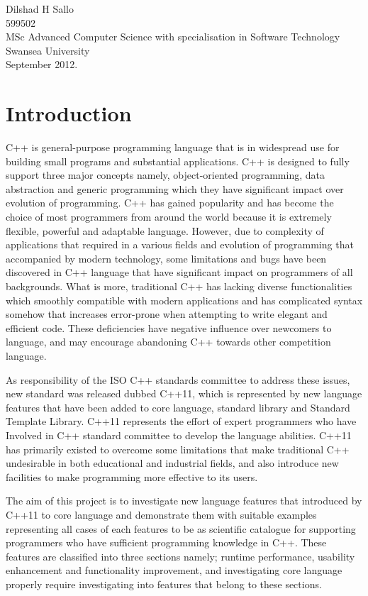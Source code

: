 \documentclass[11pt]{report}
\begin{document}
\begin{flushright}
Dilshad H Sallo\\
599502\\
MSc Advanced Computer Science with specialisation in Software Technology\\
Swansea University\\
September 2012.
\end{flushright}

\tableofcontents
\listoffigures

\chapter{Introduction}
\label{cha:intro}
C++ is general-purpose programming language that is in widespread use for building small programs and substantial applications. C++ is designed to fully support three major concepts namely, object-oriented programming, data abstraction and generic programming which they have significant impact over evolution of programming. C++ has gained popularity and has become the choice of most programmers from around the world because it is extremely flexible, powerful and adaptable language. However, due to complexity of applications that required in a various fields and evolution of programming that accompanied by modern technology, some limitations and bugs have been discovered in C++ language that have significant impact on programmers of all backgrounds.  What is more, traditional C++ has lacking diverse functionalities which smoothly compatible with modern applications and has complicated syntax somehow that increases error-prone when attempting to write elegant and efficient code.  These deficiencies have negative influence over newcomers to language, and may encourage abandoning C++ towards other competition language. 

As responsibility of the ISO C++ standards committee to address these issues, new standard was released dubbed C++11, which is represented by new language features that have been added to core language, standard library and Standard Template Library. C++11 represents the effort of expert programmers who have Involved in C++ standard committee to develop the language abilities. C++11 has primarily existed to overcome some limitations that make traditional C++  undesirable in both educational and industrial fields, and also introduce new facilities to make programming more effective to its users. 

The aim  of this project is to investigate new language features that introduced by C++11 to core language and demonstrate them with suitable examples representing all cases of each features to be as scientific catalogue for supporting programmers who have sufficient programming knowledge in C++. These features are classified into three sections namely; runtime performance, usability enhancement and functionality improvement, and investigating core language properly require investigating into features that belong to these sections.
\end{document}

